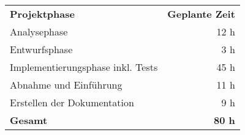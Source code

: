 \begin{tabular}{lr}
\rowcolor{heading}\textbf{Projektphase} & \textbf{Geplante Zeit} \\
Analysephase & 12 h \\
\rowcolor{odd}Entwurfsphase & 3 h \\
Implementierungsphase inkl. Tests & 45 h \\
\rowcolor{odd}Abnahme und Einführung & 11 h \\
Erstellen der Dokumentation & 9 h \\
\hline
\hline
\rowcolor{odd}\textbf{Gesamt} & \textbf{80 h} \\
\end{tabular}
